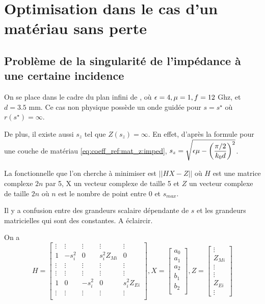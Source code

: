 \section{Optimisation dans le cas d'un matériau sans perte}

\subsection{Problème de la singularité de l'impédance à une certaine incidence}
On se place dans le cadre du plan infini de \cite{soudais_3d_2017}, où \(\epsilon=4,\mu=1,f=12\) Ghz, et \(d=3.5\) mm. Ce cas non physique possède un onde guidée pour \(s=s^\star\) où \(r(s^\star) = \infty\).

De plus, il existe aussi \(s_z\) tel que \(Z(s_z) = \infty\). En effet, d'après la formule pour une couche de matériau \eqref{eq:coeff_ref:mat_z:imped}, \(s_z = \sqrt{\epsilon \mu - \left(\dfrac{\pi/2}{k_0 d}\right)^2}\).

La fonctionnelle que l'on cherche à minimiser est \(||H X - Z||\) où \(H\) est une matrice complexe \(2n\) par 5, X un vecteur complexe de taille 5 et \(Z\) un vecteur complexe de taille \(2n\) où \(n\) est le nombre de point entre 0 et \(s_{max}\).

\begin{TODO}
  Il y a confusion entre des grandeurs scalaire dépendante de \(s\) et les grandeurs matricielles qui sont des constantes. A éclaircir.
\end{TODO}

On a
\[
  H = \begin{bmatrix}
  \vdots & \vdots & \vdots & \vdots &\vdots \\
  1 & -s_i^2 & 0 & s_i^2 Z_{Mi} & 0 \\
  \vdots & \vdots & \vdots & \vdots &\vdots \\
  \vdots & \vdots & \vdots & \vdots &\vdots \\
  1 & 0 &-s_i^2 & 0 & s_i^2 Z_{Ei} \\
  \vdots & \vdots & \vdots & \vdots &\vdots \\
  \end{bmatrix},
  X = \begin{bmatrix}
  a_0\\
  a_1\\
  a_2\\
  b_1\\
  b_2\\
  \end{bmatrix},
  Z=\begin{bmatrix}
  \vdots\\
  Z_{Mi}\\
  \vdots\\
  \vdots\\
  Z_{Ei}\\
  \vdots
  \end{bmatrix}
\]

